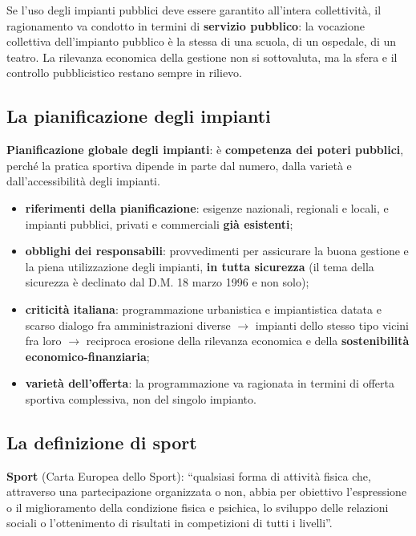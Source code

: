 Se l'uso degli impianti pubblici deve essere garantito all'intera collettività, il ragionamento
va condotto in termini di \textbf{servizio pubblico}: la vocazione collettiva dell'impianto
pubblico è la stessa di una scuola, di un ospedale, di un teatro. La rilevanza economica della
gestione non si sottovaluta, ma la sfera e il controllo pubblicistico restano sempre in rilievo.

\subsection{La pianificazione degli impianti}

\textbf{Pianificazione globale degli impianti}: è \textbf{competenza dei poteri pubblici}, perché
la pratica sportiva dipende in parte dal numero, dalla varietà e dall'accessibilità degli
impianti.

\begin{itemize}
  \item \textbf{riferimenti della pianificazione}: esigenze nazionali, regionali e locali, e
    impianti pubblici, privati e commerciali \textbf{già esistenti};
  \item \textbf{obblighi dei responsabili}: provvedimenti per assicurare la buona gestione e la
    piena utilizzazione degli impianti, \textbf{in tutta sicurezza} (il tema della sicurezza è
    declinato dal D.M. 18 marzo 1996 e non solo);
  \item \textbf{criticità italiana}: programmazione urbanistica e impiantistica datata e scarso
    dialogo fra amministrazioni diverse $\rightarrow$ impianti dello stesso tipo vicini fra loro
    $\rightarrow$ reciproca erosione della rilevanza economica e della \textbf{sostenibilità
    economico-finanziaria};
  \item \textbf{varietà dell'offerta}: la programmazione va ragionata in termini di offerta
    sportiva complessiva, non del singolo impianto.
\end{itemize}

\subsection{La definizione di sport}

\textbf{Sport} (Carta Europea dello Sport): ``qualsiasi forma di attività fisica che, attraverso
una partecipazione organizzata o non, abbia per obiettivo l'espressione o il miglioramento della
condizione fisica e psichica, lo sviluppo delle relazioni sociali o l'ottenimento di risultati in
competizioni di tutti i livelli''.


